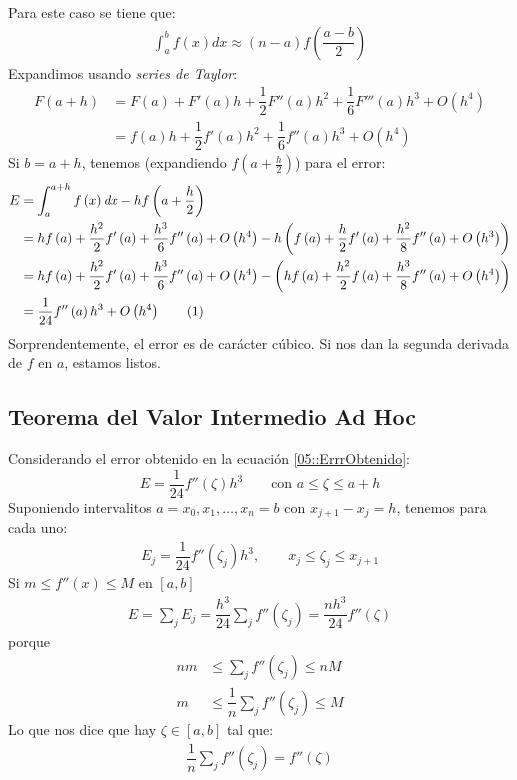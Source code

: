 \documentclass[english, spanish, fleqn, 10pt]{article}
\numberwithin{equation}{section}
\newcommand{\nparentesis}[1]{\left( #1 \right)}
\newcommand{\ncorchetes}[1]{\left[ #1 \right]}
\theoremstyle{definition}
\newcommand\numberthis{\addtocounter{equation}{1}\tag{\theequation}}
\begin{document}
Para este caso se tiene que:
\begin{align*}
\int_{a}^{b}f\nparentesis{x}\mathit{dx}\approx\nparentesis{n-a}f\nparentesis{\dfrac{a-b}{2}}
\end{align*}
Expandimos usando \textit{series de Taylor}:
\begin{align*}
F\nparentesis{a+h}&=F\nparentesis{a}+F'\nparentesis{a}h+\dfrac{1}{2}F''\nparentesis{a}h^2+\dfrac{1}{6}F'''\nparentesis{a}h^3+O\nparentesis{h^4}\\
&=f\nparentesis{a}h+\dfrac{1}{2}f'\nparentesis{a}h^2+\dfrac{1}{6}f''\nparentesis{a}h^3+O\nparentesis{h^4}
\end{align*}
Si $b=a+h$, tenemos (expandiendo $f\nparentesis{a+\frac{h}{2}}$) para el error:
\begin{align*}
E&=\int_{a}^{a+h}f\nparentesis{x}\mathit{dx}-hf\nparentesis{a+\dfrac{h}{2}}\\
&=hf\nparentesis{a}+\dfrac{h^2}{2}f'\nparentesis{a}+\dfrac{h^3}{6}f''\nparentesis{a}+O\nparentesis{h^4}-h\nparentesis{f\nparentesis{a}+\dfrac{h}{2}f'\nparentesis{a}+\dfrac{h^2}{8}f''\nparentesis{a}+O\nparentesis{h^3}}\\
&=hf\nparentesis{a}+\dfrac{h^2}{2}f'\nparentesis{a}+\dfrac{h^3}{6}f''\nparentesis{a}+O\nparentesis{h^4}-\nparentesis{hf\nparentesis{a}+\dfrac{h^2}{2}f\nparentesis{a}+\dfrac{h^3}{8}f''\nparentesis{a}+O\nparentesis{h^4}}\\
&=\dfrac{1}{24}f''\nparentesis{a}h^3+O\nparentesis{h^4}\numberthis\label{05::ErrrObtenido}
\end{align*}
Sorprendentemente, el error es de carácter cúbico. Si nos dan la segunda derivada de $f$ en $a$, estamos listos.

\subsection{Teorema del Valor Intermedio Ad Hoc}
Considerando el error obtenido en la ecuación \eqref{05::ErrrObtenido}:
\begin{equation}
E=\dfrac{1}{24}f''\nparentesis{\zeta}h^3\qquad \text{con }a\leq \zeta \leq a+h
\end{equation}
Suponiendo intervalitos $a=x_0, x_1, \ldots, x_n =b$ con $x_{j+1}-x_j=h$, tenemos para cada uno:
\begin{align*}
E_j=\dfrac{1}{24}f''\nparentesis{\zeta_j}h^3, \qquad x_j\leq \zeta _j \leq x_{j+1}
\end{align*}
Si $m\leq f''\nparentesis{x}\leq M$ en $\ncorchetes{a, b}$
\begin{align*}
E=\sum_{j}E_j=\dfrac{h^3}{24}\sum_j f''\nparentesis{\zeta _j}=\dfrac{nh^3}{24}f''\nparentesis{\zeta}
\end{align*}
porque
\begin{align*}
nm&\leq \sum_j f''\nparentesis{\zeta_j} \leq nM\\
m&\leq \dfrac{1}{n}\sum_j f''\nparentesis{\zeta_j}\leq M
\end{align*}
Lo que nos dice que hay $\zeta \in \ncorchetes{a, b}$ tal que:
\begin{align*}
\dfrac{1}{n}\sum_j f''\nparentesis{\zeta_j}=f''\nparentesis{\zeta}
\end{align*}
\end{document}
